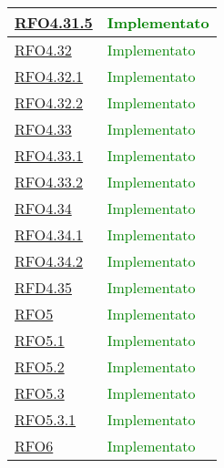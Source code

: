 \begin{longtable}{|>{\centering}m{5cm}|m{5cm}<{\centering}|}
\hyperlink{RFO4.31.5}{RFO4.31.5} & \textcolor{green}{Implementato}\\ \hline

\hyperlink{RFO4.32}{RFO4.32} &  \textcolor{green}{Implementato}\\ \hline

\hyperlink{RFO4.32.1}{RFO4.32.1} & \textcolor{green}{Implementato}\\ \hline

\hyperlink{RFO4.32.2}{RFO4.32.2} &  \textcolor{green}{Implementato}\\ \hline

\hyperlink{RFO4.33}{RFO4.33} & \textcolor{green}{Implementato}\\ \hline

\hyperlink{RFO4.33.1}{RFO4.33.1} & \textcolor{green}{Implementato}\\ \hline

\hyperlink{RFO4.33.2}{RFO4.33.2} &  \textcolor{green}{Implementato}\\ \hline

\hyperlink{RFO4.34}{RFO4.34} &  \textcolor{green}{Implementato}\\ \hline

\hyperlink{RFO4.34.1}{RFO4.34.1} & \textcolor{green}{Implementato}\\ \hline

\hyperlink{RFO4.34.2}{RFO4.34.2} &  \textcolor{green}{Implementato}\\ \hline

\hyperlink{RFD4.35}{RFD4.35} &  \textcolor{green}{Implementato}\\ \hline

\hyperlink{RFO5}{RFO5} &  \textcolor{green}{Implementato}\\ \hline

\hyperlink{RFO5.1}{RFO5.1} & \textcolor{green}{Implementato}\\ \hline

\hyperlink{RFO5.2}{RFO5.2} &  \textcolor{green}{Implementato}\\ \hline

\hyperlink{RFO5.3}{RFO5.3} &  \textcolor{green}{Implementato}\\ \hline

\hyperlink{RFO5.3.1}{RFO5.3.1} &  \textcolor{green}{Implementato}\\ \hline

\hyperlink{RFO6}{RFO6} &  \textcolor{green}{Implementato}\\ \hline


\end{longtable}
